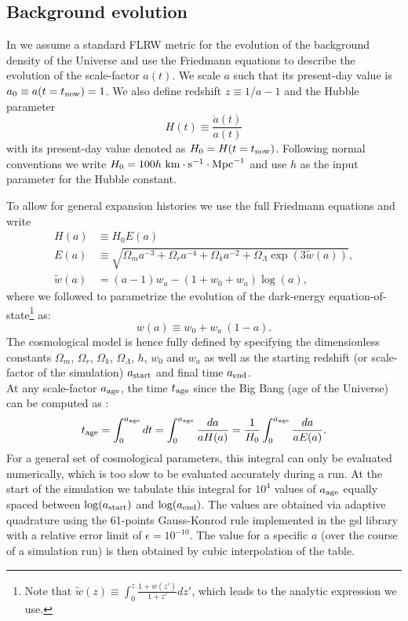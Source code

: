 \subsection{Background evolution}
\label{ssec:flrw}

In \swift we assume a standard FLRW metric for the evolution of the background
density of the Universe and use the Friedmann equations to describe the
evolution of the scale-factor $a(t)$.  We scale $a$ such that its present-day
value is $a_0 \equiv a(t=t_{\rm now}) = 1$. We also define redshift $z \equiv
1/a - 1$ and the Hubble parameter
\begin{equation}
H(t) \equiv \frac{\dot{a}(t)}{a(t)}
\end{equation}
with its present-day value denoted as $H_0 = H(t=t_{\rm now})$. Following
normal conventions we write $H_0 = 100
h~\rm{km}\cdot\rm{s}^{-1}\cdot\rm{Mpc}^{-1}$ and use $h$ as the input parameter
for the Hubble constant.

To allow for general expansion histories we use the full Friedmann equations
and write
\begin{align}
H(a) &\equiv H_0 E(a) \\ E(a) &\equiv\sqrt{\Omega_m a^{-3} + \Omega_r
  a^{-4} + \Omega_k a^{-2} + \Omega_\Lambda \exp\left(3\tilde{w}(a)\right)}, \label{eq:Ea}
\\
\tilde{w}(a) &= (a-1)w_a - (1+w_0 + w_a)\log\left(a\right),
\label{eq:friedmann}
\end{align}
where we followed \cite{Linder2003} to parametrize the evolution of
the dark-energy equation-of-state\footnote{Note that $\tilde{w}(z)\equiv
  \int_0^z \frac{1+w(z')}{1+z'}dz'$, which leads to the analytic
  expression we use.} as:
\begin{equation}
w(a) \equiv w_0 + w_a~(1-a).
\end{equation}
The cosmological model is hence fully defined by specifying the dimensionless
constants $\Omega_m$, $\Omega_r$, $\Omega_k$, $\Omega_\Lambda$, $h$, $w_0$ and
$w_a$ as well as the starting redshift (or scale-factor of the simulation)
$a_{\rm start}$ and final time $a_{\rm end}$. \\ At any scale-factor $a_{\rm
age}$, the time $t_{\rm age}$ since the Big Bang (age of the Universe) can be
computed as \citep[e.g.][]{Wright2006}:
\begin{equation}
  t_{\rm age} = \int_{0}^{a_{\rm age}} dt = \int_{0}^{a_{\rm age}}
  \frac{da}{a H(a)} = \frac{1}{H_0} \int_{0}^{a_{\rm age}}
  \frac{da}{a E(a)}. \label{eq:flrw:age}
\end{equation}
For a general set of cosmological parameters, this integral can only be
evaluated numerically, which is too slow to be evaluated accurately during a
run. At the start of the simulation we tabulate this integral for $10^4$ values
of $a_{\rm age}$ equally spaced between $\log(a_{\rm start})$ and $\log(a_{\rm
end})$. The values are obtained via adaptive quadrature using the 61-points
Gauss-Konrod rule implemented in the {\sc gsl} library \citep{GSL} with a
relative error limit of $\epsilon=10^{-10}$. The value for a specific $a$ (over
the course of a simulation run) is then obtained by cubic interpolation of the
table.

